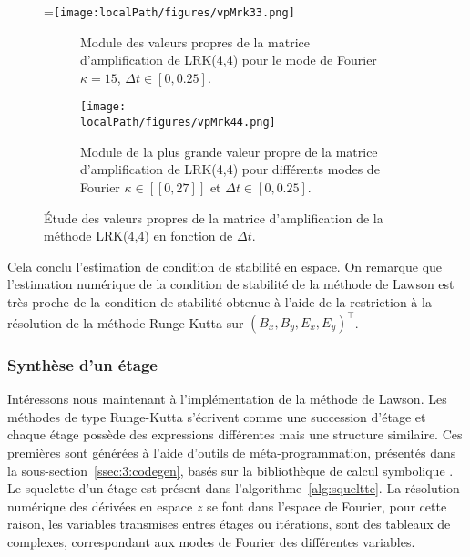 \begin{figure}[h]
  \centering
  =\hbox{\texttt{[image: \\localPath/figures/vpMrk33.png]}}
  \begin{subfigure}[b]{.45\linewidth}
    \caption{Module des valeurs propres de la matrice d'amplification de LRK(4,4) pour le mode de Fourier $\kappa=15$, $\Delta t\in[0,0.25]$.\\ }
    \label{fig:3:vpMrk44_k15}
  \end{subfigure}
  \begin{subfigure}[b]{.45\linewidth}
    \texttt{[image: \\localPath/figures/vpMrk44.png]}
    \caption{Module de la plus grande valeur propre de la matrice d'amplification de LRK(4,4) pour différents modes de Fourier $\kappa\in[\![0,27]\!]$ et $\Delta t\in[0,0.25]$.}
    \label{fig:3:vpMrk44}
  \end{subfigure}
  \caption{Étude des valeurs propres de la matrice d'amplification de la méthode LRK(4,4) en fonction de $\Delta t$.}
  \label{fig:3:vplrk44}
\end{figure}

Cela conclu l'estimation de condition de stabilité en espace. On remarque que l'estimation numérique de la condition de stabilité de la méthode de Lawson est très proche de la condition de stabilité obtenue à l'aide de la restriction à la résolution de la méthode Runge-Kutta sur $(B_x,B_y,E_x,E_y)^\top$.


\subsubsection{Synthèse d'un étage}
\label{ssec:3:stage}

Intéressons nous maintenant à l'implémentation de la méthode de Lawson. Les méthodes de type Runge-Kutta s'écrivent comme une succession d'étage et chaque étage possède des expressions différentes mais une structure similaire. Ces premières sont générées à l'aide d'outils de méta-programmation, présentés dans la sous-section~\ref{ssec:3:codegen}, basés sur la bibliothèque \Python{} de calcul symbolique \sympy{}. Le squelette d'un étage est présent dans l'algorithme~\ref{alg:squeltte}. La résolution numérique des dérivées en espace $z$ se font dans l'espace de Fourier, pour cette raison, les variables transmises entres étages ou itérations, sont des tableaux de complexes, correspondant aux modes de Fourier des différentes variables.

